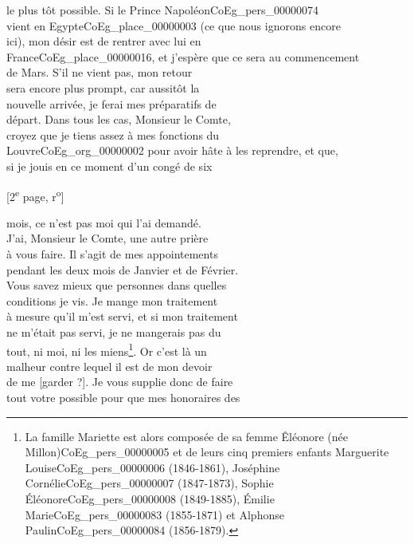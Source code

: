 \documentclass{book}
\begin{document}
{le plus tôt possible. Si le Prince Napoléon\gls{CoEg_pers_00000074}\\
vient en Egypte\gls{CoEg_place_00000003} (ce que nous ignorons encore\\
ici), mon désir est de rentrer avec lui en\\
France\gls{CoEg_place_00000016}, et j’espère que ce sera au commencement\\
de Mars. S’il ne vient pas, mon retour\\
sera encore plus prompt, car aussitôt la\\
nouvelle arrivée, je ferai mes préparatifs de\\
départ. Dans tous les cas, Monsieur le Comte,\\
croyez que je tiens assez à mes fonctions du\\
Louvre\gls{CoEg_org_00000002} pour avoir hâte à les reprendre, et que,\\
si je jouis en ce moment d’un congé de six
{\footnotesize \begin{center} [2\textsuperscript{e} page, r\textsuperscript{o}]\end{center}}
\noindent mois, ce n’est pas moi qui l’ai demandé.\\
\indent J’ai, Monsieur le Comte, une autre prière\\
à vous faire. Il s’agit de mes appointements\\
pendant les deux mois de Janvier et de Février.\\
Vous savez mieux que personnes dans quelles\\
conditions je vis. Je mange mon traitement\\
à mesure qu’il m’est servi, et si mon traitement\\
ne m’était pas servi, je ne mangerais pas du\\
tout, ni moi, ni les miens\footnote{La famille Mariette est alors composée de sa femme Êléonore (née Millon)\gls{CoEg_pers_00000005} et de leurs cinq premiers enfants Marguerite Louise\gls{CoEg_pers_00000006} (1846-1861), Joséphine Cornélie\gls{CoEg_pers_00000007} (1847-1873), Sophie Éléonore\gls{CoEg_pers_00000008} (1849-1885), Émilie Marie\gls{CoEg_pers_00000083} (1855-1871) et Alphonse Paulin\gls{CoEg_pers_00000084} (1856-1879).}. Or c’est là un\\
malheur contre lequel il est de mon devoir\\
de me [garder ?]. Je vous supplie donc de faire\\
tout votre possible pour que mes honoraires des\\
}
\end{document}
